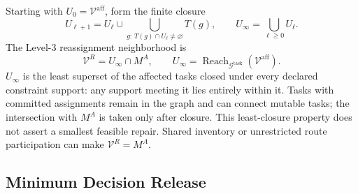 Starting with $U_0=\mathcal V^{\mathrm{aff}}$, form the finite closure
\begin{equation}
U_{\ell+1}=U_\ell\cup
\bigcup_{g:\,T(g)\cap U_\ell\ne\varnothing}T(g),
\qquad U_\infty=\bigcup_{\ell\ge0}U_\ell.
\label{eq:task_closure_iteration}
\end{equation}
The Level-3 reassignment neighborhood is
\begin{equation}
\mathcal V^{R}=U_\infty\cap M^A,
\qquad U_\infty=\operatorname{Reach}_{\mathcal G^{\mathrm{task}}}
(\mathcal V^{\mathrm{aff}}).
\label{eq:reassignment_neighborhood}
\end{equation}
$U_\infty$ is the least superset of the affected tasks closed under every
declared constraint support: any support meeting it lies entirely within
it. Tasks with committed assignments remain in the graph and can connect
mutable tasks; the intersection with $M^A$ is taken only after closure.
This least-closure property does not assert a smallest feasible repair.
Shared inventory or unrestricted route participation can make
$\mathcal V^R=M^A$.

\subsection{Minimum Decision Release}
\label{subsec:minimum_escalation}

